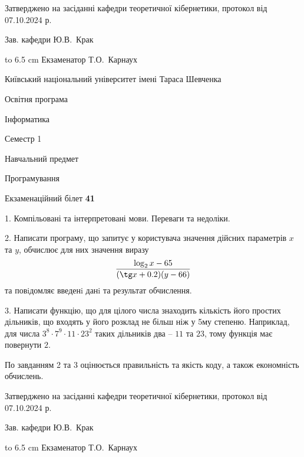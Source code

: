 \documentclass[12pt, ukrainian]{article}
\begin{document}
{\smallskip\smallskip \begin {scriptsize} Затверджено на засіданні кафедри теоретичної кібернетики, протокол   від   07.10.2024 р.\par\smallskip\smallskip\smallskip\smallskip
{\parbox {6.5 cm} {Зав. кафедри \dotfill Ю.В.~Крак}}\hspace {0.7cm} {\hbox to 6.5 cm { Екзаменатор \dotfill Т.О.~Карнаух}} \end{scriptsize}}
\vspace{0.9cm}
{{\begin {scriptsize}\par
{ \center  Київський національний університет імені Тараса Шевченка \par}
{\parbox {5 cm}{Освітня програма \hfill}{\parbox {7 cm}{Інформатика\hfill}}\parbox {6 cm}{\hfill Семестр 1}}\par
{\parbox {5 cm} {Навчальний предмет \hfill}\parbox {7 cm}{Програмування \hfill}\parbox {6cm}{\hfill}\par}\vspace{-15pt} \end{scriptsize}}{\center Екзаменаційний білет \No \textbf { 41 }\par}}
{%
1. Компільовані та інтерпретовані мови. Переваги та недоліки.%
\par
2. Написати програму, що запитує у користувача значення дійсних параметрів $x$ та $y$, обчислює для них значення виразу 
$$\frac{\log_{2} x - 65}{(\tg x + 0.2) (y - 66)}$$ 
та повiдомляє введенi данi та результат обчислення.

\par
3. Написати функцію, що для цілого числа знаходить кількість його простих дільників, що входять у його розклад не більш ніж у 5му степеню. Наприклад, для числа $3^8{\cdot}7^9{\cdot}11{\cdot}23^{2}$ таких дільників два – $11$ та $23$, тому функція має повернути $2$.

По завданням 2 та 3 оцінюється правильність та якість коду, а також економність обчислень.

}
{\smallskip\smallskip \begin {scriptsize} Затверджено на засіданні кафедри теоретичної кібернетики, протокол   від   07.10.2024 р.\par\smallskip\smallskip\smallskip\smallskip
{\parbox {6.5 cm} {Зав. кафедри \dotfill Ю.В.~Крак}}\hspace {0.7cm} {\hbox to 6.5 cm { Екзаменатор \dotfill Т.О.~Карнаух}} \end{scriptsize}}
\vspace{0.9cm}
\end{document}
